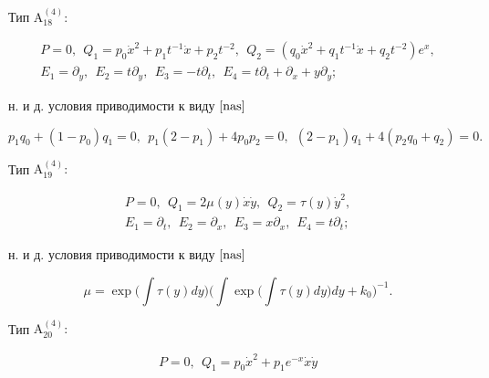 \begin{thms}
Тип $\mathrm{A^{(4)}_{18}}{:}$


\begin{gather*}


P=0,\ \


Q_1=p_0\Dot x^2+{p_1 t^{-1}}\Dot x


+{p_2 t^{-2}},\ \ 


Q_2=(q_0\Dot x^2+{q_1t^{-1}}\Dot x


+{q_2 t^{-2}})e^x, \\


E_1=\partial_y,\ \ E_2=t\partial_ y,\ \ E_3=-t\partial_t,


\ \ E_4=t\partial_t+\partial_x+y\partial_y;


\end{gather*}


н. и д. условия приводимости к виду $\eqref{nas}$


$$


{ p_1}{ q_0}+(1 - { p_0})q_1=0, \ \


{ p_1}(2 - { p_1}) + 4{ p_0}{ p_2}=0,\ \


(2- { p_1}){ q_1}+4( { p_2}{ q_0}+{ q_2})=0.


$$





Тип $\mathrm{A^{(4)}_{19}}{:}$


\begin{gather*}


P=0,\ \ Q_1=2\mu(y)\Dot x\Dot y,\ \ Q_2=\tau(y)\Dot y^2,\\


E_1=\partial_t,\ \ E_2=\partial_ x,\ \ E_3=x\partial_x,


\ \ E_4=t\partial_t;


\end{gather*}


н. и д. условия приводимости к виду $\eqref{nas}$


$$


\mu=\exp\Big(\int \tau(y)dy\Big)\Big(\int


\exp\Big(\int \tau(y)dy\Big)dy+k_0\Big)^{-1}.


$$





Тип $\mathrm{A^{(4)}_{20}}{:}$


\begin{gather*}


P=0,\ \ Q_1=p_0\Dot x^2+ p_1 e^{-x}\Dot x\Dot y



\end{gather*}
\end{thms}
